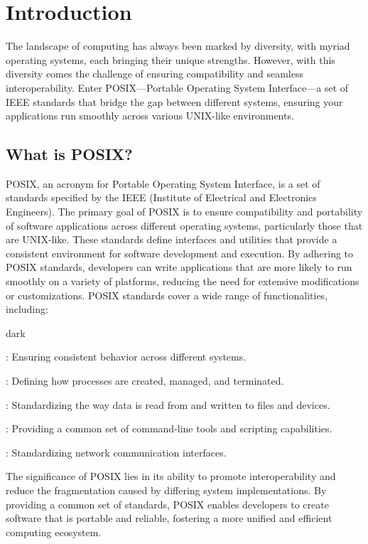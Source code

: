 \section{Introduction}
\label{sec:introduction}
The landscape of computing has always been marked by diversity, with myriad operating systems, each bringing their unique strengths. However, with this diversity comes the challenge of ensuring compatibility and seamless interoperability.
Enter POSIX—Portable Operating System Interface—a set of IEEE standards that bridge the gap between different systems, ensuring your applications run smoothly across various UNIX-like environments.

\subsection{What is POSIX?}
\label{sec:introduction:sub:what}
POSIX, an acronym for Portable Operating System Interface, is a set of standards specified by the IEEE (Institute of Electrical and Electronics Engineers). The primary goal of POSIX is to ensure compatibility and portability of software applications across different operating systems, particularly those that are UNIX-like.
These standards define interfaces and utilities that provide a consistent environment for software development and execution. By adhering to POSIX standards, developers can write applications that are more likely to run smoothly on a variety of platforms, reducing the need for extensive modifications or customizations.
POSIX standards cover a wide range of functionalities, including: 
\bigskip
\begin{baseBoxOne}{}{dark}
    \begin{posnexItemize} 
        \item[\sA] : Ensuring consistent behavior across different systems. 
        \item[\sA] : Defining how processes are created, managed, and terminated. 
        \item[\sA] : Standardizing the way data is read from and written to files and devices. 
        \item[\sA] : Providing a common set of command-line tools and scripting capabilities. 
        \item[\sA] : Standardizing network communication interfaces.
    \end{posnexItemize}
\end{baseBoxOne}
\bigskip
The significance of POSIX lies in its ability to promote interoperability and reduce the fragmentation caused by differing system implementations.
By providing a common set of standards, POSIX enables developers to create software that is portable and reliable, fostering a more unified and efficient computing ecosystem.

